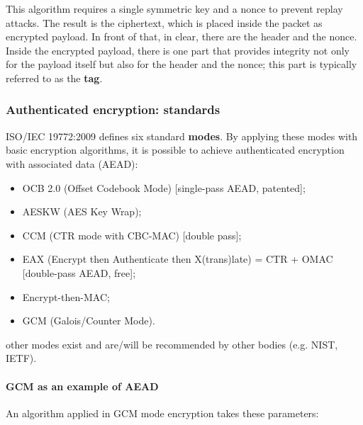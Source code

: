 This algorithm requires a single symmetric key and a nonce to prevent replay attacks. The result is the ciphertext, which is placed inside the packet as encrypted payload. In front of that, in clear, there are the header and the nonce. Inside the encrypted payload, there is one part that provides integrity not only for the payload itself but also for the header and the nonce; this part is typically referred to as the \textbf{tag}.


\subsubsection{Authenticated encryption: standards}
ISO/IEC 19772:2009 defines six standard \textbf{modes}. By applying these modes with basic encryption algorithms, it is possible to achieve authenticated encryption with associated data (AEAD):

\begin{itemize}
	\item OCB 2.0 (Offset Codebook Mode) [single-pass AEAD, patented];
	\item AESKW (AES Key Wrap);
	\item CCM (CTR mode with CBC-MAC) [double pass];
	\item EAX (Encrypt then Authenticate then X(trans)late) = CTR + OMAC [double-pass AEAD, free];
	\item Encrypt-then-MAC;
	\item GCM (Galois/Counter Mode).
\end{itemize}
other modes exist and are/will be recommended by other bodies (e.g. NIST, IETF).


\paragraph{GCM as an example of AEAD}

An algorithm applied in GCM mode encryption takes these parameters:

